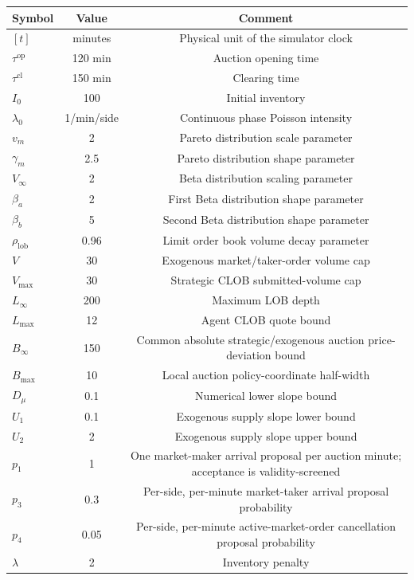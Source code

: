 \begin{table}[ht!]
\centering
\begin{tabular}{lcc}
\toprule
\textbf{Symbol} & \textbf{Value} & \textbf{Comment} \\
\midrule
$[t]$ & minutes & Physical unit of the simulator clock \\
$\tau^{\mathrm{op}}$ & 120 min & Auction opening time \\
$\tau^{\mathrm{cl}}$ & 150 min & Clearing time \\
$I_0$ & 100 & Initial inventory \\
$\lambda_0$ & 1/min/side & Continuous phase Poisson intensity \\
$v_m$ & 2 & Pareto distribution scale parameter \\
$\gamma_m$ & 2.5 & Pareto distribution shape parameter \\
$V_\infty$ & 2 & Beta distribution scaling parameter \\
$\beta_a$ & 2 & First Beta distribution shape parameter \\
$\beta_b$ & 5 & Second Beta distribution shape parameter \\
$\rho_{\text{lob}}$ & 0.96 & Limit order book volume decay parameter \\
$V$ & 30 & Exogenous market/taker-order volume cap \\
$V_\text{max}$ & 30 & Strategic CLOB submitted-volume cap \\
$L_\infty$ & 200 & Maximum LOB depth \\
$L_\text{max}$ & 12 & Agent CLOB quote bound \\
$B_\infty$ & 150 & Common absolute strategic/exogenous auction price-deviation bound \\
$B_\text{max}$ & 10 & Local auction policy-coordinate half-width \\
$D_\mu$ & 0.1 & Numerical lower slope bound \\
$U_1$ & 0.1 & Exogenous supply slope lower bound \\
$U_2$ & 2 & Exogenous supply slope upper bound \\
$p_1$ & 1 & One market-maker arrival proposal per auction minute; acceptance is validity-screened \\
$p_3$ & 0.3 & Per-side, per-minute market-taker arrival proposal probability \\
$p_4$ & 0.05 & Per-side, per-minute active-market-order cancellation proposal probability \\
$\lambda$ & 2 & Inventory penalty \\

\end{tabular}
\end{table}
